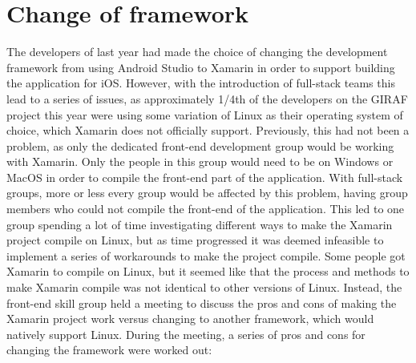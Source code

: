 \section{Change of framework}
The developers of last year had made the choice of changing the development framework from using Android Studio to Xamarin in order to support building the application for iOS.
However, with the introduction of full-stack teams this lead to a series of issues, as approximately 1/4th of the developers on the GIRAF project this year were using some variation of Linux as their operating system of choice, which Xamarin does not officially support.
Previously, this had not been a problem, as only the dedicated front-end development group would be working with Xamarin. 
Only the people in this group would need to be on Windows or MacOS in order to compile the front-end part of the application.
With full-stack groups, more or less every group would be affected by this problem, having group members who could not compile the front-end of the application.
This led to one group spending a lot of time investigating different ways to make the Xamarin project compile on Linux, but as time progressed it was deemed infeasible to implement a series of workarounds to make the project compile.
Some people got Xamarin to compile on Linux, but it seemed like that the process and methods to make Xamarin compile was not identical to other versions of Linux.
Instead, the front-end skill group held a meeting to discuss the pros and cons of making the Xamarin project work versus changing to another framework, which would natively support Linux.
During the meeting, a series of pros and cons for changing the framework were worked out:


